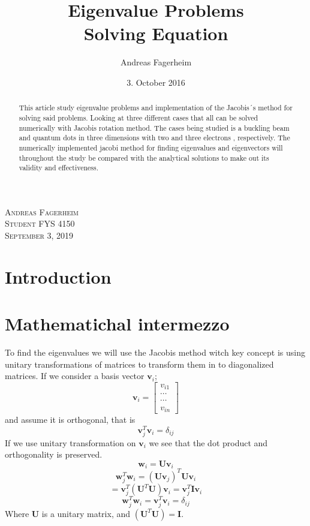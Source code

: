 \documentclass{article}
\title{Eigenvalue Problems \\
		Solving \SL Equation
		}
\author{Andreas Fagerheim}
\date{3. October 2016}
\begin{document}
\maketitle
	

\begin{abstract}
This article study eigenvalue problems and implementation of the Jacobis´s method for solving said problems. Looking at three different cases that all can be solved numerically with Jacobis rotation method. The cases being studied is a buckling beam and quantum dots in three dimensions with two and three electrons , respectively. The numerically implemented jacobi method for finding eigenvalues and eigenvectors will throughout the study be compared with the analytical solutions to make out its validity and effectiveness.
\end{abstract}
\begin{flushright}
	\textsc{Andreas Fagerheim \\
	Student FYS 4150\\
	September 3, 2019}
	\end{flushright}

\cleardoublepage
\section{Introduction}




\section{Mathematichal intermezzo}\label{sec:math}
To find the eigenvalues we will use the Jacobis method witch key concept is using unitary transformations of matrices to transform them in to diagonalized matrices. %
If we consider a basis vector $\mathbf{v}_i$;
$$\mathbf{v}_i = \begin{bmatrix}
					v_{i1} \\
					\cdots\\
					\cdots\\
					v_{in}
\end{bmatrix}
$$
and  assume it is orthogonal, that is
$$\mathbf{v}_j^T \mathbf{v}_i = \delta_{ij}$$
If we use unitary transformation on $\mathbf{v}_i$ we see that the dot product and orthogonality is preserved. 
$$
\mathbf{w}_i = \mathbf{U}\mathbf{v}_i
$$
$$
\mathbf{w}_j^T\mathbf{w}_i = (\mathbf{U}\mathbf{v}_j)^T \mathbf{U}\mathbf{v}_i
$$$$
= \mathbf{v}_j^T(\mathbf{U}^T \mathbf{U})\mathbf{v}_i = \mathbf{v}_j^T\mathbf{I}\mathbf{v}_i 
$$
$$
\mathbf{w}_j^T\mathbf{w}_i = \mathbf{v}_j^T\mathbf{v}_i = \delta_{ij}
$$
Where $\mathbf{U}$ is a unitary matrix, and $(\mathbf{U}^T \mathbf{U}) =\mathbf{I} $.
\end{document}
